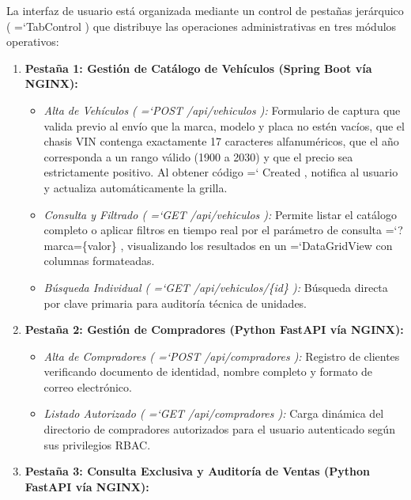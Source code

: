 \documentclass[11pt,a4paper]{article}
\renewcommand{\_}{\oldunderscore\allowbreak}
\DeclareRobustCommand{\texttt}[1]{%
  {\upshape\ttfamily\fontsize{9}{10.8}\selectfont\hyphenchar\font=`\-\relax #1}%
}
\begin{document}
\noindent La interfaz de usuario está organizada mediante un control de pestañas jerárquico (\texttt{TabControl}) que distribuye las operaciones administrativas en tres módulos operativos:
\begin{enumerate}[leftmargin=*,itemsep=2pt,topsep=1pt]
  \item \textbf{Pestaña 1: Gestión de Catálogo de Vehículos (Spring Boot vía NGINX):}
  \begin{itemize}[leftmargin=*,itemsep=1pt]
    \item \textit{Alta de Vehículos (\texttt{POST /\allowbreak{}api/\allowbreak{}vehiculos}):} Formulario de captura que valida previo al envío que la marca, modelo y placa no estén vacíos, que el chasis VIN contenga exactamente 17 caracteres alfanuméricos, que el año corresponda a un rango válido (1900 a 2030) y que el precio sea estrictamente positivo. Al obtener código \texttt{201 Created}, notifica al usuario y actualiza automáticamente la grilla.
    \item \textit{Consulta y Filtrado (\texttt{GET /\allowbreak{}api/\allowbreak{}vehiculos}):} Permite listar el catálogo completo o aplicar filtros en tiempo real por el parámetro de consulta \texttt{?\allowbreak{}marca=\allowbreak{}\{valor\}}, visualizando los resultados en un \texttt{DataGridView} con columnas formateadas.
    \item \textit{Búsqueda Individual (\texttt{GET /\allowbreak{}api/\allowbreak{}vehiculos/\allowbreak{}\{id\}}):} Búsqueda directa por clave primaria para auditoría técnica de unidades.
  \end{itemize}
  \item \textbf{Pestaña 2: Gestión de Compradores (Python FastAPI vía NGINX):}
  \begin{itemize}[leftmargin=*,itemsep=1pt]
    \item \textit{Alta de Compradores (\texttt{POST /\allowbreak{}api/\allowbreak{}compradores}):} Registro de clientes verificando documento de identidad, nombre completo y formato de correo electrónico.
    \item \textit{Listado Autorizado (\texttt{GET /\allowbreak{}api/\allowbreak{}compradores}):} Carga dinámica del directorio de compradores autorizados para el usuario autenticado según sus privilegios RBAC.
  \end{itemize}
  \item \textbf{Pestaña 3: Consulta Exclusiva y Auditoría de Ventas (Python FastAPI vía NGINX):}
  \begin{itemize}[leftmargin=*,itemsep=1pt]

\end{itemize}
\end{enumerate}
\end{document}
